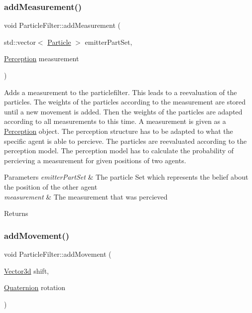 \subsubsection{\texorpdfstring{add\+Measurement()}{addMeasurement()}}
{\footnotesize\ttfamily void Particle\+Filter\+::add\+Measurement (\begin{DoxyParamCaption}\item[{std\+::vector$<$ \hyperlink{classParticle}{Particle} $>$}]{emitter\+Part\+Set,  }\item[{\hyperlink{structPerception}{Perception}}]{measurement }\end{DoxyParamCaption})}



Adds a measurement to the particlefilter. This leads to a reevaluation of the particles. The weights of the particles according to the measurement are stored until a new movement is added. Then the weights of the particles are adapted according to all measurements to this time. A measurement is given as a \hyperlink{structPerception}{Perception} object. The perception structure has to be adapted to what the specific agent is able to percieve. The particles are reevaluated according to the perception model. The perception model has to calculate the probability of percieving a measurement for given positions of two agents. 


\begin{DoxyParams}{Parameters}
{\em emitter\+Part\+Set} & The particle Set which represents the belief about the position of the other agent \\
\hline
{\em measurement} & The measurement that was percieved\\
\hline
\end{DoxyParams}
\begin{DoxyReturn}{Returns}

\end{DoxyReturn}
\mbox{\label{classParticleFilter_a88095fc284f68875a7c695503c0198ce}} 
\subsubsection{\texorpdfstring{add\+Movement()}{addMovement()}}
{\footnotesize\ttfamily void Particle\+Filter\+::add\+Movement (\begin{DoxyParamCaption}\item[{\hyperlink{structVector3d}{Vector3d}}]{shift,  }\item[{\hyperlink{structQuaternion}{Quaternion}}]{rotation }\end{DoxyParamCaption})}



